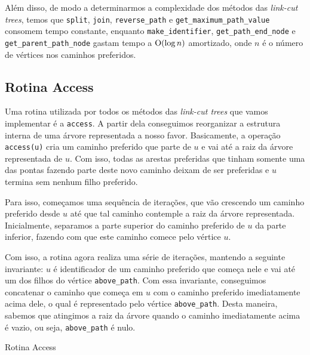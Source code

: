 Além disso, de modo a determinarmos a complexidade dos métodos das \emph{link-cut trees}, temos que \texttt{split}, \texttt{join}, \texttt{reverse\_path} e \texttt{get\_maximum\_path\_value} consomem tempo constante, enquanto \texttt{make\_identifier}, \texttt{get\_path\_end\_node} e \texttt{get\_parent\_path\_node} gastam tempo a $\mathrm{O}(\log n)$ amortizado, onde $n$ é o número de vértices nos caminhos preferidos.

\subsection{Rotina Access}
\label{subsection:lct-access}

Uma rotina utilizada por todos os métodos das \emph{link-cut trees} que vamos implementar é a \texttt{access}. A partir dela conseguimos reorganizar a estrutura interna de uma árvore representada a nosso favor. Basicamente, a operação \texttt{access(u)} cria um caminho preferido que parte de $u$ e vai até a raiz da árvore representada de $u$. Com isso, todas as arestas preferidas que tinham somente uma das pontas fazendo parte deste novo caminho deixam de ser preferidas e $u$ termina sem nenhum filho preferido.

Para isso, começamos uma sequência de iterações, que vão crescendo um caminho preferido desde $u$ até que tal caminho contemple a raiz da árvore representada. Inicialmente, separamos a parte superior do caminho preferido de $u$ da parte inferior, fazendo com que este caminho comece pelo vértice $u$.

Com isso, a rotina agora realiza uma série de iterações, mantendo a seguinte invariante: $u$ é identificador de um caminho preferido que começa nele e vai até um dos filhos do vértice \texttt{above\_path}. Com essa invariante, conseguimos concatenar o caminho que começa em $u$ com o caminho preferido imediatamente acima dele, o qual é representado pelo vértice \texttt{above\_path}. Desta maneira, sabemos que atingimos a raiz da árvore quando o caminho imediatamente acima é vazio, ou seja, \texttt{above\_path} é nulo.

\begin{algorithm}[h!]
    \caption{Rotina Access}\label{lct:access}
    \begin{algorithmic}[1]
        \State {}
        \State {}
        \EndWhile
        \EndFunction
    \end{algorithmic}
\end{algorithm}

